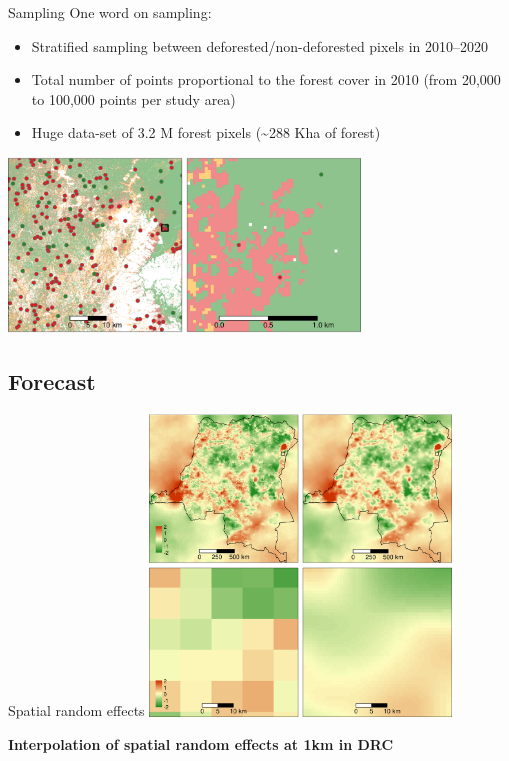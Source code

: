 \documentclass[10pt,table,dvipsnames,compress]{beamer}
\begin{document}
\begin{frame}[label={sec:org4b2e36c}]{Sampling}
One word on sampling:

\begin{itemize}
\item Stratified sampling between deforested/non-deforested pixels in
2010--2020
\item Total number of points proportional to the forest cover in 2010 (from
20,000 to 100,000 points per study area)
\item Huge data-set of 3.2 M forest pixels (\textasciitilde{}288 Kha of forest)
\end{itemize}

\centering \includegraphics[width=0.7\textwidth]{figs/sm/sample.png}
\end{frame}

\subsection{Forecast}
\label{sec:org5c36b9f}
\begin{frame}[label={sec:orgd8c13c0}]{Spatial random effects}
\centering \includegraphics[width=0.6\textwidth]{figs/sm/rho.png}

\textbf{Interpolation of spatial random effects at 1km in DRC}
\end{frame}
\end{document}
